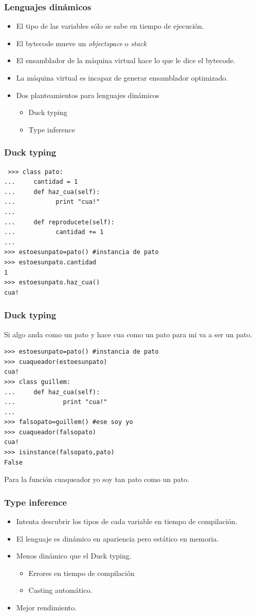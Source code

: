 \documentclass{beamer}
\begin{document}
\begin{frame}
  \frametitle{Lenguajes dinámicos}
  \begin{itemize}
  \item El tipo de las variables sólo se sabe en tiempo de ejecución.
  \item El bytecode mueve un \textit{objectspace} o \textit{stack}
  \item El ensamblador de la máquina virtual hace lo que le dice el
    bytecode.
  \item La máquina virtual es incapaz de generar ensamblador
    optimizado.
  \item Dos planteamientos para lenguajes dinámicos
    \begin{itemize}
    \item Duck typing
    \item Type inference
    \end{itemize}
  \end{itemize}
\end{frame}


\begin{frame}[containsverbatim]
\frametitle{Duck typing}
\begin{verbatim}
 >>> class pato:
...     cantidad = 1
...     def haz_cua(self):
...           print "cua!"
...
...     def reproducete(self):
...           cantidad += 1
...
>>> estoesunpato=pato() #instancia de pato
>>> estoesunpato.cantidad
1
>>> estoesunpato.haz_cua()
cua!
\end{verbatim} 
\end{frame}

\begin{frame}[containsverbatim]
 \frametitle{Duck typing}
Si algo anda como un pato y hace cua como un pato para mi va a ser un pato.
\begin{verbatim}
>>> estoesunpato=pato() #instancia de pato
>>> cuaqueador(estoesunpato)
cua!
>>> class guillem:
...     def haz_cua(self):
...             print "cua!"
...
>>> falsopato=guillem() #ese soy yo
>>> cuaqueador(falsopato)
cua!
>>> isinstance(falsopato,pato)
False
\end{verbatim}
Para la función cuaqueador yo soy tan pato como un pato.
\end{frame}

\begin{frame}
  \frametitle{Type inference}
  \begin{itemize}
  \item Intenta descubrir los tipos de cada variable en tiempo de
    compilación.
  \item El lenguaje es dinámico en apariencia pero estático en
    memoria.
  \item Menos dinámico que el Duck typing.
    \begin{itemize}
    \item Errores en tiempo de compilación
    \item Casting automático.
    \end{itemize}
  \item Mejor rendimiento.
  \end{itemize}
\end{frame}
\end{document}
